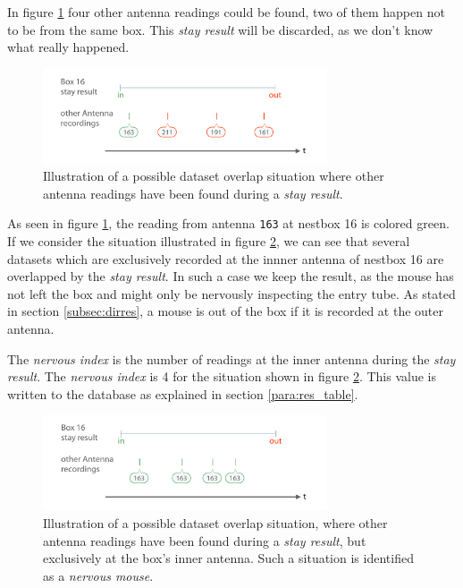 In figure \ref{fig:dataset_overlap} four other antenna readings could be found, two of them happen not to be from the same box. This \textit{stay result} will be discarded, as we don't know what really happened.

\begin{figure}[htpb]
\begin{center}
  \includegraphics[width=0.75\textwidth]{assets/pdf/dataset_overlap_schema.pdf}
  \caption[Dataset overlap situation]{Illustration of a possible dataset overlap situation where other antenna readings have been found during a \textit{stay result}.}
  \label{fig:dataset_overlap}
\end{center}
\end{figure}

As seen in figure \ref{fig:dataset_overlap}, the reading from antenna \lstinline|163| at nestbox 16 is colored green. If we consider the situation illustrated in figure \ref{fig:dataset_overlap_nervous}, we can see that several datasets which are exclusively recorded at the innner antenna of nestbox 16 are overlapped by the \textit{stay result}. In such a case we keep the result, as the mouse has not left the box and might only be nervously inspecting the entry tube. As stated in section \ref{subsec:dirres}, a mouse is out of the box if it is recorded at the outer antenna.

The \textit{nervous index} is the number of readings at the inner antenna during the \textit{stay result}. The \textit{nervous index} is 4 for the situation shown in figure \ref{fig:dataset_overlap_nervous}. This value is written to the database as explained in section \ref{para:res_table}.

\begin{figure}[htpb]
\begin{center}
  \includegraphics[width=0.75\textwidth]{assets/pdf/dataset_overlap_nervous_schema.pdf}
  \caption[Dataset overlap situation for a \textit{nervous mouse}]{Illustration of a possible dataset overlap situation, where other antenna readings have been found during a \textit{stay result}, but exclusively at the box's inner antenna. Such a situation is identified as a \textit{nervous mouse}.}
  \label{fig:dataset_overlap_nervous}
\end{center}
\end{figure}

